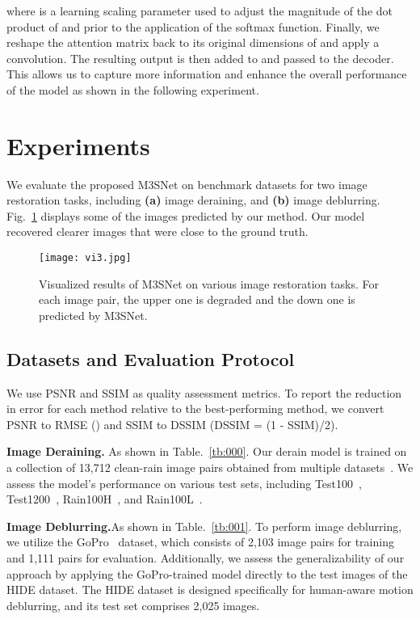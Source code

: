 \documentclass[sn-mathphys,Numbered]{sn-jnl}
\theoremstyle{thmstyleone}\newtheorem{theorem}{Theorem}\newtheorem{proposition}[theorem]{Proposition}
\theoremstyle{thmstyletwo}\newtheorem{example}{Example}\newtheorem{remark}{Remark}
\theoremstyle{thmstylethree}\newtheorem{definition}{Definition}
\begin{document}
where  is a learning scaling parameter used to adjust the magnitude of the dot product of  and  prior to the application of the softmax function. Finally, we reshape the attention matrix back to its original dimensions of  and apply a  convolution. The resulting output is then added to  and passed to the decoder. This allows us to capture more information and enhance the overall performance of the model as shown in the following experiment.

\section{Experiments}
We evaluate the proposed M3SNet on benchmark datasets  for two image restoration tasks, including \textbf{(a)} image deraining, and \textbf{(b)} image deblurring. Fig.~\ref{fig:05} displays some of the images predicted by our method. Our model recovered clearer images that were close to the ground truth.

\begin{figure} \centerline{\texttt{[image: vi3.jpg]}}
	\caption{Visualized results of M3SNet on various image restoration tasks. For each image pair, the upper one is degraded and the down one is predicted by M3SNet.
}
	\label{fig:05}
\end{figure}

\subsection{Datasets and  Evaluation Protocol}
We use PSNR and SSIM as quality assessment metrics. To report the reduction in error for each method relative to the best-performing method, we convert PSNR to RMSE () and SSIM to DSSIM (DSSIM = (1 - SSIM)/2).

\noindent\textbf{Image Deraining.} As shown in Table.~\ref{tb:000}. Our derain model is trained on a collection of 13,712 clean-rain image pairs obtained from multiple datasets~\cite{238099669,81Yang2016DeepJR,90Zhang2017ImageDU,DIDMDN}. We assess the model's performance on various test sets, including Test100~\cite{90Zhang2017ImageDU}, Test1200~\cite{DIDMDN}, Rain100H~\cite{81Yang2016DeepJR}, and Rain100L~\cite{81Yang2016DeepJR}.

\noindent\textbf{Image Deblurring.}As shown in Table.~\ref{tb:001}. To perform image deblurring, we utilize the GoPro~\cite{Gopro} dataset, which consists of 2,103 image pairs for training and 1,111 pairs for evaluation. Additionally, we assess the generalizability of our approach by applying the GoPro-trained model directly to the test images of the HIDE dataset. The HIDE dataset is designed specifically for human-aware motion deblurring, and its test set comprises 2,025 images.
\end{document}
